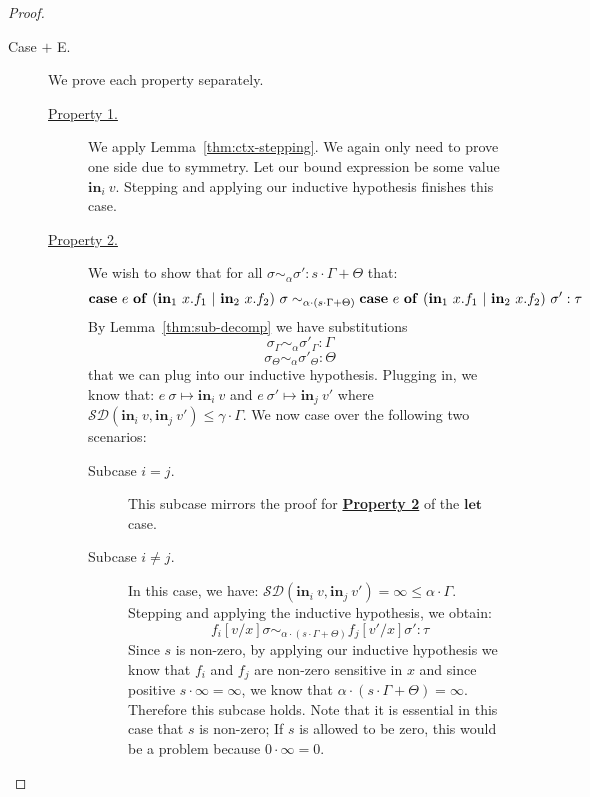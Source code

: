 \begin{proof}
\begin{description}
    \item[Case $+$ E.] 
      We prove each property separately.
      \begin{description}
        \item[\underline{Property 1.}]
          We apply Lemma~\ref{thm:ctx-stepping}. We again only need to prove one
          side due to symmetry. Let our bound expression be some value
          $\textbf{in}_i ~ v$. Stepping and applying our inductive hypothesis
          finishes this case.
        \item[\underline{Property 2.}]
          We wish to show that for all 
          $\sigma \sim_{\alpha} \sigma': s \cdot \Gamma + \Theta$ 
          that:
          $$
          \mathbf{case} \ e \ \mathbf{of} \ (\tin_1 \ x.f_1 \ | \ \tin_2 \ x.f_2)~\sigma
          \sim_{\alpha \cdot (s \cdot \Gamma + \Theta)}
          \mathbf{case} \ e \ \mathbf{of} \ (\tin_1 \ x.f_1 \ | \ \tin_2 \ x.f_2)~\sigma'
          : \tau
          $$
          By Lemma~\ref{thm:sub-decomp} we have substitutions
          $$
          \sigma_{\Gamma} \sim_{\alpha} \sigma'_{\Gamma} : \Gamma
          $$
          $$
          \sigma_{\Theta} \sim_{\alpha} \sigma'_{\Theta} : \Theta
          $$
          that we can plug into our inductive hypothesis. Plugging in, we
          know that: $e~\sigma \mapsto \mathbf{in}_i~v$ 
          and $e~\sigma' \mapsto \mathbf{in}_j~v'$ where
          $\mathcal{SD}(\mathbf{in}_i~v, \mathbf{in}_j~v') 
          \leq \gamma \cdot \Gamma$.
          We now case over the following two scenarios:
          \begin{description}
            \item[Subcase $i = j$.] This subcase mirrors the proof for
              \textbf{\underline{Property 2}} of the $\textbf{let}$ case.
            \item[Subcase $i \not= j$.] In this case, we have:
              $\mathcal{SD}(\mathbf{in}_i~v, \mathbf{in}_j~v') = \infty \leq
              \alpha \cdot \Gamma$. Stepping and applying the inductive
              hypothesis, we obtain:
              $$
              f_i [v/x]\sigma 
              \sim_{\alpha \cdot (s \cdot \Gamma + \Theta)}
              f_j [v'/x]\sigma'
              : \tau
              $$
              Since $s$ is non-zero, by applying our inductive hypothesis we
              know that $f_i$ and $f_j$ are non-zero sensitive in $x$ and since
              positive $s \cdot \infty = \infty$, we know that $\alpha \cdot (s
              \cdot \Gamma + \Theta) = \infty$. Therefore this subcase holds.
              Note that it is essential in this case that $s$ is non-zero; If
              $s$ is allowed to be zero, this would be a problem because $0
              \cdot \infty = 0$.
          \end{description}


\end{description}
\end{description}
\end{proof}
